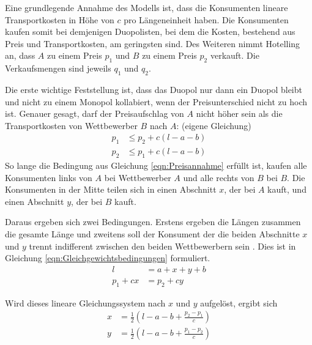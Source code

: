 Eine grundlegende Annahme des Modells ist, dass die Konsumenten lineare Transportkosten in Höhe von $c$ pro Längeneinheit haben.
Die Konsumenten kaufen somit bei demjenigen Duopolisten, bei dem die Kosten, bestehend aus Preis und Transportkosten, am geringsten sind.
Des Weiteren nimmt Hotelling an, dass $A$ zu einem Preis $p_1$ und $B$ zu einem Preis $p_2$ verkauft.
Die Verkaufsmengen sind jeweils $q_1$ und $q_2$. \citep[S.\,45]{hotelling1929}

Die erste wichtige Feststellung ist, dass das Duopol nur dann ein Duopol bleibt und nicht zu einem Monopol kollabiert, wenn der Preisunterschied nicht zu hoch ist.
Genauer gesagt, darf der Preisaufschlag von $A$ nicht höher sein als die Transportkosten von Wettbewerber $B$ nach $A$: \citep[S.\,45-6]{hotelling1929} (eigene Gleichung)
\begin{equation}\label{eqn:Preisannahme}
\begin{split}
p_1 &\leq p_2 + c(l-a-b) \\
p_2 &\leq p_1 + c(l-a-b)
\end{split}
\end{equation}
So lange die Bedingung aus Gleichung \ref{eqn:Preisannahme} erfüllt ist, kaufen alle Konsumenten links von $A$ bei Wettbewerber $A$ und alle rechts von $B$ bei $B$.
Die Konsumenten in der Mitte teilen sich in einen Abschnitt $x$, der bei $A$ kauft, und einen Abschnitt $y$, der bei $B$ kauft.

Daraus ergeben sich zwei Bedingungen. Erstens ergeben die Längen zusammen die gesamte Länge und zweitens soll der Konsument der die beiden Abschnitte $x$ und $y$ trennt indifferent zwischen den beiden Wettbewerbern sein \citep[S.\,46]{hotelling1929}. Dies ist in Gleichung \ref{eqn:Gleichgewichtsbedingungen} formuliert.
\begin{equation}\label{eqn:Gleichgewichtsbedingungen}
\begin{split}
l &= a + x + y + b \\
p_1 + cx &= p_2 + cy
\end{split}
\end{equation}

Wird dieses lineare Gleichungssystem nach $x$ und $y$ aufgelöst, ergibt sich \citep[S.\,46]{hotelling1929}
\begin{equation}
\begin{split}
x &= \tfrac{1}{2} \left(l-a-b+\frac{p_2-p_1}{c}\right)\\
y &= \tfrac{1}{2} \left(l-a-b+\frac{p_1-p_2}{c}\right)
\end{split}
\end{equation}

